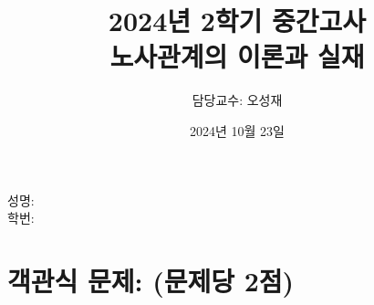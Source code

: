 \documentclass[11pt,]{exam} %
\begin{document}

    \title{\relax
        2024년 2학기 중간고사 \\
        \Large
        노사관계의 이론과 실재
    }
    \author{담당교수: 오성재}
    \date{2024년 10월 23일}
    \maketitle

    \noindent
    성명: \makebox[.3\textwidth]{\hrulefill} \\[3pt]
    학번: \makebox[.3\textwidth]{\hrulefill}

    \addpoints\relax

\section*{객관식 문제: (문제당 2점)}
\end{document}
